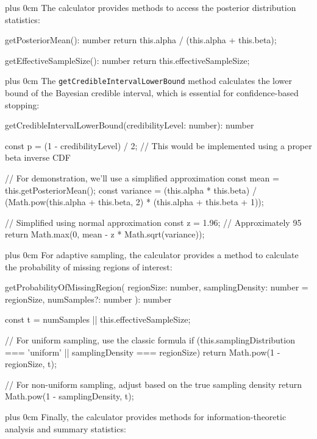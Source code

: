 \documentclass[11pt,a4paper]{article}
\newcommand{\justifytext}{\leftskip=0pt \rightskip=0pt plus 0cm}
\begin{document}
\justifytext
The calculator provides methods to access the posterior distribution statistics:

\begin{wrappedcode}
  getPosteriorMean(): number {
    return this.alpha / (this.alpha + this.beta);
  }
  
  getEffectiveSampleSize(): number {
    return this.effectiveSampleSize;
  }
\end{wrappedcode}

\justifytext
The \texttt{getCredibleIntervalLowerBound} method calculates the lower bound of the Bayesian credible interval, which is essential for confidence-based stopping:

\begin{wrappedcode}
  getCredibleIntervalLowerBound(credibilityLevel: number): number {
    const p = (1 - credibilityLevel) / 2;
    // This would be implemented using a proper beta inverse CDF
    
    // For demonstration, we'll use a simplified approximation
    const mean = this.getPosteriorMean();
    const variance = (this.alpha * this.beta) / 
      (Math.pow(this.alpha + this.beta, 2) * (this.alpha + this.beta + 1));
    
    // Simplified using normal approximation
    const z = 1.96; // Approximately 95%
    return Math.max(0, mean - z * Math.sqrt(variance));
  }
\end{wrappedcode}

\justifytext
For adaptive sampling, the calculator provides a method to calculate the probability of missing regions of interest:

\begin{wrappedcode}
  getProbabilityOfMissingRegion(
    regionSize: number, 
    samplingDensity: number = regionSize, 
    numSamples?: number
  ): number {
    const t = numSamples || this.effectiveSampleSize;
    
    // For uniform sampling, use the classic formula
    if (this.samplingDistribution === 'uniform' || samplingDensity === regionSize) {
      return Math.pow(1 - regionSize, t);
    }
    
    // For non-uniform sampling, adjust based on the true sampling density
    return Math.pow(1 - samplingDensity, t);
  }
\end{wrappedcode}

\justifytext
Finally, the calculator provides methods for information-theoretic analysis and summary statistics:
\end{document}
